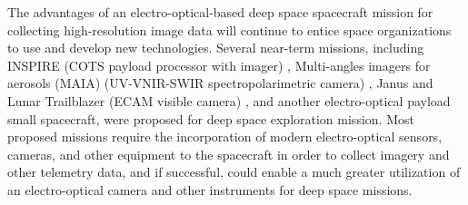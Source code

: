 \documentclass[final,5p,times,sort&compress,twocolumn]{elsarticle}
\begin{document}
The advantages of an electro-optical-based deep space spacecraft mission for collecting high-resolution image data will continue to entice space organizations to use and develop new technologies. Several near-term missions, including INSPIRE (COTS payload processor with imager) \cite{klesh2013inspire, jpl2023}, Multi-angles imagers for aerosols (MAIA) (UV-VNIR-SWIR spectropolarimetric camera) \cite{liu2017multi, jpl2023}, Janus and Lunar Trailblazer (ECAM visible camera) \cite{shoer2021janus, arthur1997, jpl2023}, and another electro-optical payload small spacecraft, were proposed for deep space exploration mission. Most proposed missions require the incorporation of modern electro-optical sensors, cameras, and other equipment to the spacecraft in order to collect imagery and other telemetry data, and if successful, could enable a much greater utilization of an electro-optical camera and other instruments for deep space missions.
\end{document}
